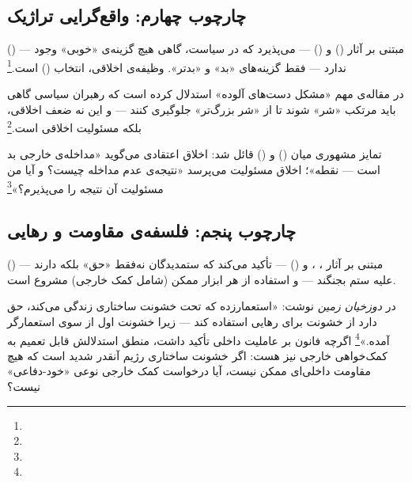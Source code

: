 \subsection{چارچوب چهارم: واقع‌گرایی تراژیک}
\label{subsec:ch15-tragic-realism}

 () — مبتنی بر آثار  () و  () — می‌پذیرد که در سیاست، گاهی هیچ گزینه‌ی «خوبی» وجود ندارد — فقط گزینه‌های «بد» و «بدتر». وظیفه‌ی اخلاقی، انتخاب  () است.\footnote{}

\begin{tcolorbox}[wavebox, title={واقع‌گرایی تراژیک و نجات‌طلبی فداکارانه}]
 در مقاله‌ی مهم «مشکل دست‌های آلوده» استدلال کرده است که رهبران سیاسی گاهی باید مرتکب «شر» شوند تا از «شر بزرگ‌تر» جلوگیری کنند — و این نه ضعف اخلاقی، بلکه مسئولیت اخلاقی است.\footnote{}

 تمایز مشهوری میان  () و  () قائل شد: اخلاق اعتقادی می‌گوید «مداخله‌ی خارجی بد است — نقطه»؛ اخلاق مسئولیت می‌پرسد «نتیجه‌ی عدم مداخله چیست؟ و آیا من مسئولیت آن نتیجه را می‌پذیرم؟»\footnote{}
\end{tcolorbox}

\subsection{چارچوب پنجم: فلسفه‌ی مقاومت و رهایی}
\label{subsec:ch15-liberation-philosophy}

 () — مبتنی بر آثار ، ، و  () — تأکید می‌کند که ستمدیدگان نه‌فقط «حق» بلکه  دارند علیه ستم بجنگند — و استفاده از هر ابزار ممکن (شامل کمک خارجی) مشروع است.

 در \textit{دوزخیان زمین} نوشت: «استعمارزده که تحت خشونت ساختاری زندگی می‌کند، حق دارد از خشونت برای رهایی استفاده کند — زیرا خشونت اول از سوی استعمارگر آمده.»\footnote{} اگرچه فانون بر عاملیت داخلی تأکید داشت، منطق استدلالش قابل تعمیم به کمک‌خواهی خارجی نیز هست: اگر خشونت ساختاری رژیم آنقدر شدید است که هیچ مقاومت داخلی‌ای ممکن نیست، آیا درخواست کمک خارجی نوعی «خود-دفاعی» نیست؟



